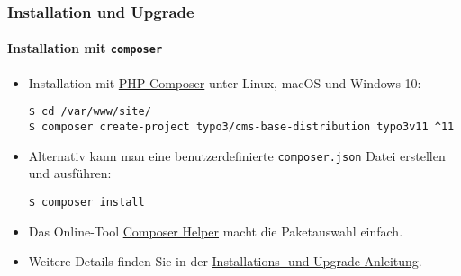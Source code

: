 %

\begin{frame}[fragile]
	\frametitle{Installation und Upgrade}
	\framesubtitle{Installation mit \texttt{composer}}


	\begin{itemize}
		\item Installation mit \href{https://getcomposer.org}{PHP Composer} unter Linux, macOS und Windows 10:
\begin{lstlisting}
$ cd /var/www/site/
$ composer create-project typo3/cms-base-distribution typo3v11 ^11
\end{lstlisting}

		\item Alternativ kann man eine benutzerdefinierte \texttt{composer.json} Datei erstellen und ausführen:
\begin{lstlisting}
$ composer install
\end{lstlisting}

		\item Das Online-Tool \href{https://get.typo3.org/misc/composer/helper}{Composer Helper}
			macht die Paketauswahl einfach.

		\item Weitere Details finden Sie in der
			\href{https://docs.typo3.org/m/typo3/guide-installation/master/en-us/}{Installations- und Upgrade-Anleitung}.

	\end{itemize}
\end{frame}

